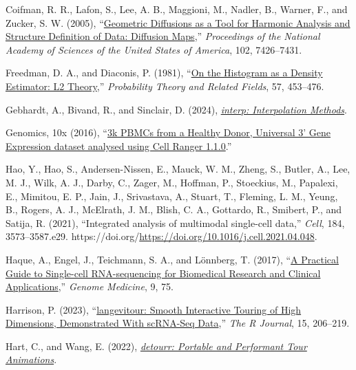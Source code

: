 \documentclass[
  11pt,
  a4paper,
]{report}
\newlength{\cslhangindent}
\newenvironment{CSLReferences}[2] %
 {\begin{list}{}{%
  \setlength{\itemindent}{0pt}
  \setlength{\leftmargin}{0pt}
  \setlength{\parsep}{0pt}
  \ifodd #1
   \setlength{\leftmargin}{\cslhangindent}
   \setlength{\itemindent}{-1\cslhangindent}
  \fi
  \setlength{\itemsep}{#2\baselineskip}}}
 {\end{list}}
\begin{document}
\begin{CSLReferences}{1}{0}
Coifman, R. R., Lafon, S., Lee, A. B., Maggioni, M., Nadler, B., Warner,
F., and Zucker, S. W. (2005),
{``\href{/url\%7Bhttps://www.pnas.org/doi/abs/10.1073/pnas.0500334102\%7D.}{{Geometric
Diffusions as a Tool for Harmonic Analysis and Structure Definition of
Data: Diffusion Maps}},''} \emph{Proceedings of the National Academy of
Sciences of the United States of America}, 102, 7426--7431.

Freedman, D. A., and Diaconis, P. (1981),
{``\href{/url\%7Bhttps://doi.org/10.1007/BF01025868\%7D.}{{On the
Histogram as a Density Estimator: L2 Theory}},''} \emph{Probability
Theory and Related Fields}, 57, 453--476.

Gebhardt, A., Bivand, R., and Sinclair, D. (2024),
\emph{\href{/url\%7Bhttps://CRAN.R-project.org/package=interp\%7D.}{{interp:
Interpolation Methods}}}.

Genomics, 10x (2016),
{``\href{/url\%7Bhttps://www.10xgenomics.com/datasets/3-k-pbm-cs-from-a-healthy-donor-1-standard-1-1-0\%7D.}{{3k
PBMCs from a Healthy Donor, Universal 3' Gene Expression dataset
analysed using Cell Ranger 1.1.0}}.''}

Hao, Y., Hao, S., Andersen-Nissen, E., Mauck, W. M., Zheng, S., Butler,
A., Lee, M. J., Wilk, A. J., Darby, C., Zager, M., Hoffman, P.,
Stoeckius, M., Papalexi, E., Mimitou, E. P., Jain, J., Srivastava, A.,
Stuart, T., Fleming, L. M., Yeung, B., Rogers, A. J., McElrath, J. M.,
Blish, C. A., Gottardo, R., Smibert, P., and Satija, R. (2021),
{``Integrated analysis of multimodal single-cell data,''} \emph{Cell},
184, 3573--3587.e29.
https://doi.org/\url{https://doi.org/10.1016/j.cell.2021.04.048}.

Haque, A., Engel, J., Teichmann, S. A., and Lönnberg, T. (2017),
{``\href{/url\%7Bhttps://doi.org/10.1186/s13073-017-0467-4\%7D.}{{A
Practical Guide to Single-cell RNA-sequencing for Biomedical Research
and Clinical Applications}},''} \emph{Genome Medicine}, 9, 75.

Harrison, P. (2023),
{``\href{/url\%7Bhttps://doi.org/10.32614/RJ-2023-046\%7D.}{{langevitour:
Smooth Interactive Touring of High Dimensions, Demonstrated With
scRNA-Seq Data}},''} \emph{The R Journal}, 15, 206--219.

Hart, C., and Wang, E. (2022),
\emph{\href{/url\%7Bhttps://casperhart.github.io/detourr/\%7D.}{{detourr:
Portable and Performant Tour Animations}}}.


\end{CSLReferences}
\end{document}
